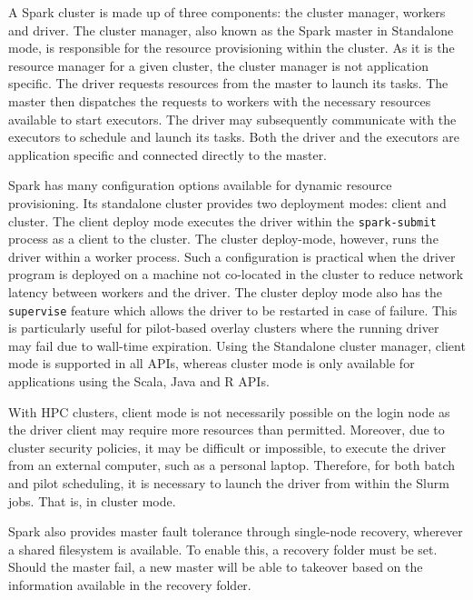 \documentclass{IEEEtran}
\begin{document}
    A Spark cluster is made up of three components: the cluster manager, workers and
    driver. The cluster manager, also known as the Spark master in Standalone mode, is responsible for the
    resource provisioning within the cluster.  As it is the resource manager for a given cluster,
    the cluster manager is not application specific. The driver requests resources from the master
    to launch its tasks. The master then dispatches the requests to workers with
    the necessary resources available to start
    executors. The driver may subsequently communicate with the executors to schedule and launch its tasks. Both the driver and
    the executors are application specific and connected directly to the master. 

    Spark has many configuration options available for dynamic resource provisioning.
    Its standalone cluster provides two deployment modes: client and cluster. The client
    deploy mode executes the driver within the \texttt{spark-submit} process as
    a client to the cluster. The cluster deploy-mode, however, runs the driver within
    a worker process. Such a configuration is practical when the driver program
    is deployed on a machine not co-located in the cluster to reduce network 
    latency between workers and the driver. The cluster deploy mode also has the \texttt{supervise}
    feature which allows the driver to be restarted in case of failure.
    This is particularly useful for
    pilot-based overlay clusters where the running driver may fail due to wall-time expiration.
    Using the Standalone cluster manager, client mode is supported in all APIs, whereas cluster mode is
    only available for applications using the Scala, Java and R APIs.

    With HPC clusters, client mode is not necessarily possible on the login node as the
    driver client may require more resources than permitted. Moreover, due to cluster
    security policies, it may be difficult or impossible, to execute the driver from
    an external computer, such as a personal laptop. Therefore, for both batch and pilot
    scheduling, it is necessary to launch the driver from within the Slurm jobs. That is, in cluster mode.

    Spark also provides master fault tolerance through single-node recovery, wherever a shared
    filesystem is available. To enable this, a recovery folder must be set. Should the master
    fail, a new master will be able to takeover based on the information available in the recovery
    folder.
\end{document}
